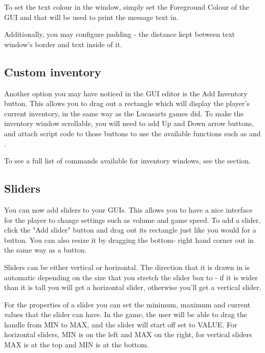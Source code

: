 To set the text colour in the window, simply set the Foreground Colour of
the GUI and that will be used to print the message text in.

Additionally, you may configure padding - the distance kept between text
window's border and text inside of it.

\subsection{Custom inventory}%

Another option you may have noticed in the GUI editor is the Add Inventory
button. This allows you to drag out a rectangle which will display the
player's current inventory, in the same way as the Lucasarts games did. To
make the inventory window scrollable, you will need to add Up and Down arrow
buttons, and attach script code to those buttons to use the available
functions such as  and
.

To see a full list of commands available for inventory windows, see
the  section.

\subsection{Sliders}%

You can now add sliders to your GUIs. This allows you to have a nice interface
for the player to change settings such as volume and game speed.
To add a slider, click the "Add slider" button and drag out its rectangle just
like you would for a button. You can also resize it by dragging the bottom-
right hand corner out in the same way as a button.

Sliders can be either vertical or horizontal. The direction that it is drawn
in is automatic depending on the size that you stretch the slider box to - if
it is wider than it is tall you will get a horizontal slider, otherwise you'll
get a vertical slider.

For the properties of a slider you can set the minimum, maximum and current
values that the slider can have. In the game, the user will be able to drag
the handle from MIN to MAX, and the slider will start off set to VALUE.
For horizontal sliders, MIN is on the left and MAX on the right, for vertical
sliders MAX is at the top and MIN is at the bottom.


